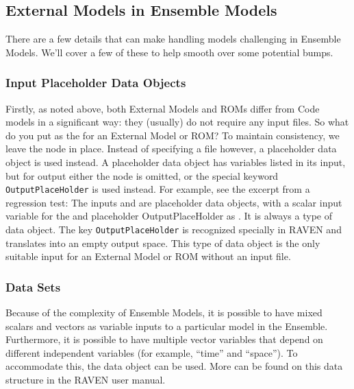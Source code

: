 \subsection{External Models in Ensemble Models}
There are a few details that can make handling  models challenging in Ensemble Models.
We'll cover a few of these to help smooth over some potential bumps.

\subsubsection{Input Placeholder Data Objects}
Firstly, as noted above, both External Models and ROMs differ from Code models in a significant way: they
(usually) do not require any input files.  So what do you put as the  for an External Model or
ROM?  To maintain consistency, we leave the  node in place.  Instead of specifying a file
however, a
placeholder data object is used instead.  A placeholder data object has variables listed in its input, but
for output either the  node is omitted, or the special keyword \texttt{OutputPlaceHolder} is used
instead.  For example, see the excerpt from a regression test:
The inputs  and  are placeholder data objects, with a scalar input
variable for the  and placeholder OutputPlaceHolder as .  It is always a
 type of data object.  The key
\texttt{OutputPlaceHolder} is recognized specially in RAVEN and translates into an empty output space.  This
type of data object is the only suitable input for an External Model or ROM without an input file.

\subsubsection{Data Sets}
Because of the complexity of Ensemble Models, it is possible to have mixed scalars and vectors as variable
inputs to a particular model in the Ensemble.  Furthermore, it is possible to have multiple vector variables
that depend on different independent variables (for example, ``time'' and ``space'').  To accommodate this,
the  data object can be used.  More can be found on this data structure in the RAVEN user
manual. %

